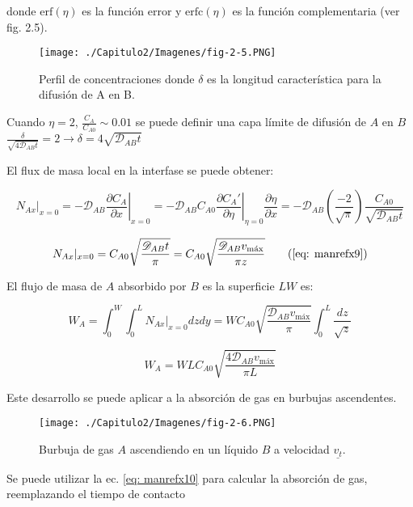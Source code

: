  donde $\text{erf} (\eta)$ es la función error y $\text{erfc}(\eta)$ es la función complementaria (ver fig. 2.5).
 
 \begin{figure}[H]
 	\centering
 	\texttt{[image: ./Capitulo2/Imagenes/fig-2-5.PNG]}
 	\caption{Perfil de concentraciones donde $\delta$ es la longitud característica para la difusión de A en B.}
 \end{figure}
 
 Cuando $\eta = 2$, $\frac{C_A}{C_{A0}} \sim 0.01$ se puede definir una capa límite de difusión de $A$ en $B$ $\frac{\delta}{\sqrt{4\mathscr{D}_{AB}t}} = 2 \to \delta = 4 \sqrt{\mathscr{D}_{AB}t}$
 
 El flux de masa local en la interfase se puede obtener:
 
 $$N_{Ax}|_{x=0} = -\mathscr{D}_{AB} \left. \frac{\partial C_A}{\partial x} \right|_{x=0} = -\mathscr{D}_{AB} C_{A0} \left. \frac{\partial C_A'}{\partial \eta} \right| _{\eta = 0} \frac{\partial \eta}{\partial x} = -\mathscr{D}_{AB} \left( \frac{-2}{\sqrt{\pi}} \right) \frac{C_{A0}}{\sqrt{\mathscr{D}_{AB}t}}$$
 
 \begin{equation}
 	N_{Ax}|_{x=0} = C_{A0} \sqrt{\frac{\mathscr{D}_{AB}t}{\pi}} = C_{A0} \sqrt{ \frac{\mathscr{D}_{AB} v_{\text{máx}}}{\pi z}}
 	\tag{\ref{eq: manrefx9}}
 \end{equation}
 
 El flujo de masa de $A$ absorbido por $B$ es la superficie $LW$ es:
 
 $$W_A = \int_0^W \int_0^L N_{Ax}|_{x=0} dz dy = WC_{A0} \sqrt{\frac{\mathscr{D}_{AB} v_{\text{máx}}}{\pi}} \int_0^L \frac{dz}{\sqrt{z}}$$
 
 \begin{equation} \label{eq: manrefx10}
 W_A = WLC_{A0} \sqrt{\frac{4\mathscr{D}_{AB} v_{\text{máx}}}{\pi L}}
 \end{equation}
 
 Este desarrollo se puede aplicar a la absorción de gas en burbujas ascendentes.
 
 \begin{figure}[H]
 	\centering
 	\texttt{[image: ./Capitulo2/Imagenes/fig-2-6.PNG]}
 	\caption{Burbuja de gas $A$ ascendiendo en un líquido $B$ a velocidad $\underline{v_t}$.}
 \end{figure}
 
 Se puede utilizar la ec. \eqref{eq: manrefx10} para calcular la absorción de gas, reemplazando el tiempo de contacto 
 
